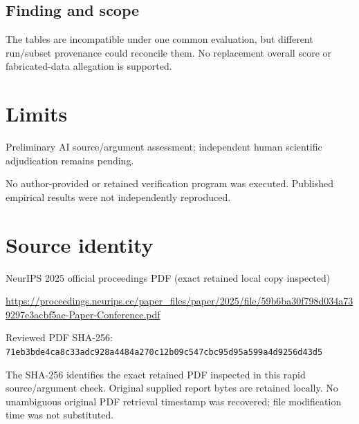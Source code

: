 \documentclass[11pt]{article}
\begin{document}
\subsection*{Finding and scope}

The tables are incompatible under one common evaluation, but different run/subset provenance could reconcile them. No replacement overall score or fabricated-data allegation is supported.

\section*{Limits}

Preliminary AI source/argument assessment; independent human scientific adjudication remains pending.\par

No author-provided or retained verification program was executed. Published empirical results were not independently reproduced.\par

\section*{Source identity}

NeurIPS 2025 official proceedings PDF (exact retained local copy inspected)

\url{https://proceedings.neurips.cc/paper_files/paper/2025/file/59b6ba30f798d034a739297e3acbf5ae-Paper-Conference.pdf}

Reviewed PDF SHA-256: \nolinkurl{71eb3bde4ca8c33adc928a4484a270c12b09c547cbc95d95a599a4d9256d43d5}

The SHA-256 identifies the exact retained PDF inspected in this rapid source/argument check. Original supplied report bytes are retained locally. No unambiguous original PDF retrieval timestamp was recovered; file modification time was not substituted.
\end{document}
